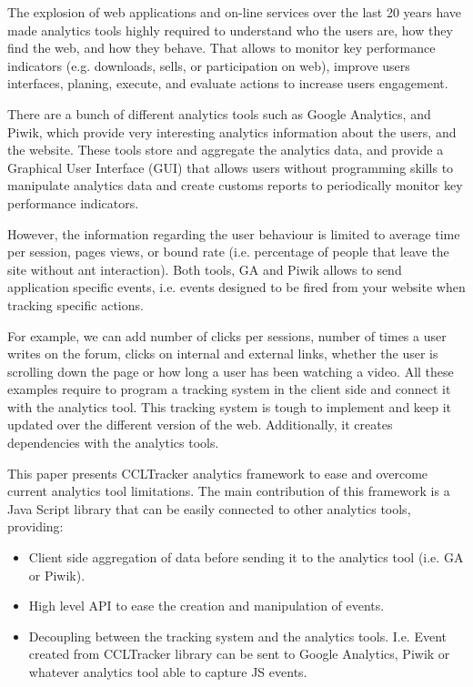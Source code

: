 \documentclass{article}
\begin{document}
The explosion of web applications and on-line services over the last 20 years have made analytics tools highly required to understand who the users are, how they find the web, and how they behave. That allows to monitor key performance indicators (e.g. downloads, sells, or participation on web), improve users interfaces, planing, execute, and evaluate actions to increase users engagement. 

There are a bunch of different analytics tools such as Google Analytics, and Piwik, which provide very interesting analytics information about the users, and the website. These tools store and aggregate the analytics data, and provide a Graphical User Interface (GUI) that allows users without programming skills to manipulate analytics data and create customs reports to periodically monitor key performance indicators.  

However, the information regarding the user behaviour is limited to average time per session, pages views, or bound rate (i.e. percentage of people that leave the site without ant interaction). Both tools, GA and Piwik allows to send application specific events, i.e. events designed to be fired from your website when tracking specific actions. 

 For example, we can add number of clicks per sessions, number of times a user writes on the forum, clicks on internal and external links, whether the user is scrolling down the page or how long a user has been watching a video. All these examples require to program a tracking system in the client side and connect it with the analytics tool. This tracking system is tough to implement and keep it updated over the different version of the web. Additionally, it creates dependencies with the analytics tools.


This paper presents CCLTracker analytics framework to ease and overcome current analytics tool limitations. The main contribution of this framework is a Java Script library that can be easily connected to other analytics tools, providing:

\begin{itemize}
\item Client side aggregation of data before sending it to the analytics tool (i.e. GA or Piwik). 
\item High level API to ease the creation and manipulation of events. 
\item Decoupling between the tracking system and the analytics tools. I.e. Event created from CCLTracker library can be sent to Google Analytics, Piwik or whatever analytics tool able to capture JS events. 
\end{itemize}
\end{document}
